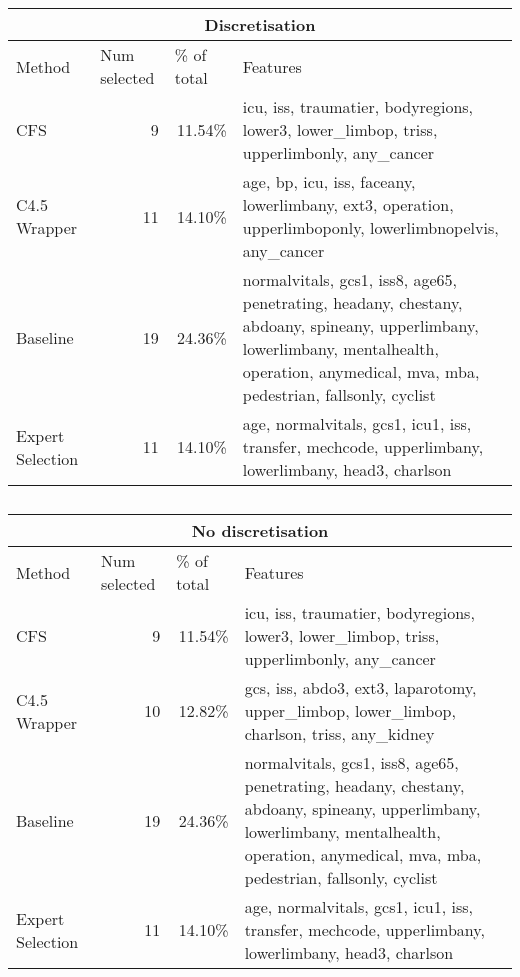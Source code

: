 \begin{table}[hbp]
\caption{}
\begin{tabular}{|l|r|r|p{8.5cm}|}
\hline
\multicolumn{ 4}{|c|}{Discretisation} \\ \hline
Method & \multicolumn{1}{l|}{Num selected} & \multicolumn{1}{l|}{\% of total} & Features \\ \hline
CFS & 9 & 11.54\% & icu, iss, traumatier, bodyregions, lower3, lower\_limbop, triss, upperlimbonly, any\_cancer \\ \hline
C4.5 Wrapper & 11 & 14.10\% & age, bp, icu, iss, faceany, lowerlimbany, ext3, operation, upperlimboponly, lowerlimbnopelvis, any\_cancer \\ \hline
Baseline & 19 & 24.36\% & normalvitals, gcs1, iss8, age65, penetrating, headany, chestany, abdoany, spineany, upperlimbany, lowerlimbany, mentalhealth, operation, anymedical, mva, mba, pedestrian, fallsonly, cyclist \\ \hline
Expert Selection & 11 & 14.10\% & age, normalvitals, gcs1, icu1, iss, transfer, mechcode, upperlimbany, lowerlimbany, head3, charlson \\ \hline
\end{tabular}
\vspace{1cm}
\vfill
\begin{tabular}{|l|r|r|p{8.5cm}|}
\hline
\multicolumn{ 4}{|c|}{No discretisation} \\ \hline
Method & \multicolumn{1}{l|}{Num selected} & \multicolumn{1}{l|}{\% of total} & Features \\ \hline
CFS & 9 & 11.54\% & icu, iss, traumatier, bodyregions, lower3, lower\_limbop, triss, upperlimbonly, any\_cancer \\ \hline
C4.5 Wrapper & 10 & 12.82\% & gcs, iss, abdo3, ext3, laparotomy, upper\_limbop, lower\_limbop, charlson, triss, any\_kidney \\ \hline
Baseline & 19 & 24.36\% & normalvitals, gcs1, iss8, age65, penetrating, headany, chestany, abdoany, spineany, upperlimbany, lowerlimbany, mentalhealth, operation, anymedical, mva, mba, pedestrian, fallsonly, cyclist \\ \hline
Expert Selection & 11 & 14.10\% & age, normalvitals, gcs1, icu1, iss, transfer, mechcode, upperlimbany, lowerlimbany, head3, charlson \\ \hline
\end{tabular}
\end{table}
